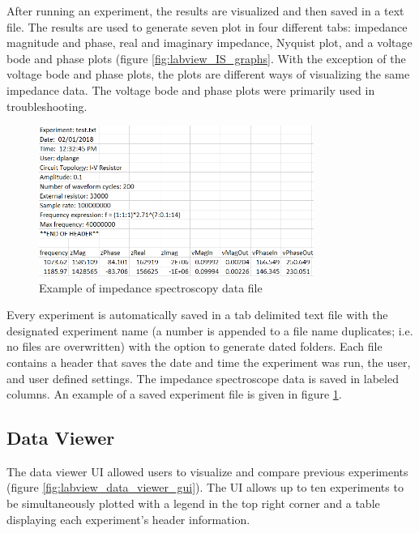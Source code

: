 \par After running an experiment, the results are visualized and then saved in a text file. The results are used to generate seven plot in four different tabs: impedance magnitude and phase, real and imaginary impedance, Nyquist plot, and a voltage bode and phase plots (figure \ref{fig:labview_IS_graphs}. With the exception of the voltage bode and phase plots, the plots are different ways of visualizing the same impedance data. The voltage bode and phase plots were primarily used in troubleshooting. 


\begin{figure}[h]
    \centering
    \includegraphics[width=0.8\textwidth]{images/labview_data.png}
    \caption{Example of impedance spectroscopy data file}
    \label{fig:labview_data}
\end{figure}

\par Every experiment is automatically saved in a tab delimited text file with the designated experiment name (a number is appended to a file name duplicates; i.e. no files are overwritten) with the option to generate dated folders. Each file contains a header that saves the date and time the experiment was run, the user, and user defined settings. The impedance spectroscope data is saved in labeled columns. An example of a saved experiment file is given in figure \ref{fig:labview_data}.
\FloatBarrier

\subsection{Data Viewer}

\par The data viewer UI allowed users to visualize and compare previous experiments (figure \ref{fig:labview_data_viewer_gui}). The UI allows up to ten experiments to be simultaneously plotted with a legend in the top right corner and a table displaying each experiment's header information.

